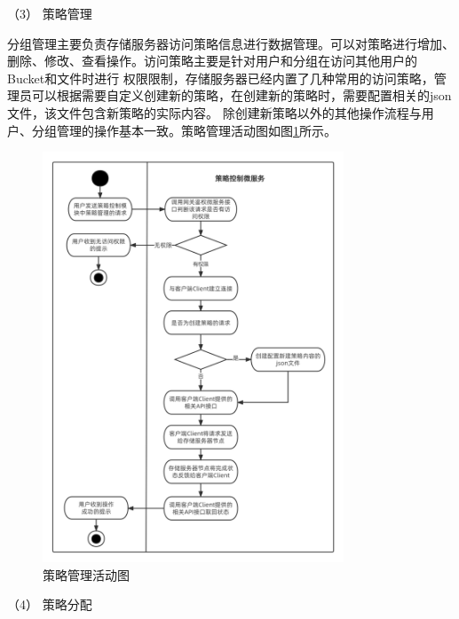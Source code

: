 
（3） 策略管理

分组管理主要负责存储服务器访问策略信息进行数据管理。可以对策略进行增加、删除、修改、查看操作。访问策略主要是针对用户和分组在访问其他用户的Bucket和文件时进行
权限限制，存储服务器已经内置了几种常用的访问策略，管理员可以根据需要自定义创建新的策略，在创建新的策略时，需要配置相关的json文件，该文件包含新策略的实际内容。
除创建新策略以外的其他操作流程与用户、分组管理的操作基本一致。策略管理活动图如图\ref{fig:策略管理活动图}所示。

\begin{figure}[htb]
    \centering
    \includegraphics[width=0.8\textwidth]{my_figures/chapter4/策略管理活动图.png}
    \caption{策略管理活动图}
    \label{fig:策略管理活动图}
\end{figure}

（4） 策略分配

